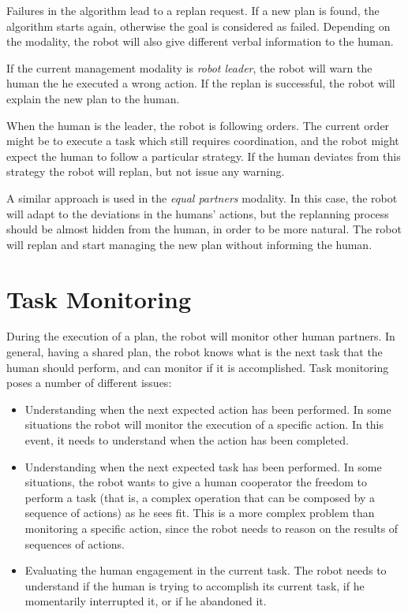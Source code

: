 Failures in the algorithm lead to a replan request. If a new plan is found, the algorithm starts again, otherwise the goal is considered as failed. Depending on the modality, the robot will also give different verbal information to the human.

If the current management modality is \textit{robot leader}, the robot will warn the human the he executed a wrong action. If the replan is successful, the robot will explain the new plan to the human. 

When the human is the leader, the robot is following orders. The current order might be to execute a task which still requires coordination, and the robot might expect the human to follow a particular strategy. If the human deviates from this strategy the robot will replan, but not issue any warning.

A similar approach is used in the \textit{equal partners} modality. In this case, the robot will adapt to the deviations in the humans' actions, but the replanning process should be almost hidden from the human, in order to be more natural. The robot will replan and start managing the new plan without informing the human.


\section{Task Monitoring}
\label{sec:plan_management-plan_monitoring}

During the execution of a plan, the robot will monitor other human partners. In general, having a shared plan, the robot knows what is the next task that the human should perform, and can monitor if it is accomplished. Task monitoring poses a number of different issues:
\begin{itemize}
\item Understanding when the next expected action has been performed. In some situations the robot will monitor the execution of a specific action. In this event, it needs to understand when the action has been completed.
\item Understanding when the next expected task has been performed. In some situations, the robot wants to give a human cooperator the freedom to perform a task (that is, a complex operation that can be composed by a sequence of actions) as he sees fit. This is a more complex problem than monitoring a specific action, since the robot needs to reason on the results of sequences of actions.
\item Evaluating the human engagement in the current task. The robot needs to understand if the human is trying to accomplish its current task, if he momentarily interrupted it, or if he abandoned it.
\end{itemize}

